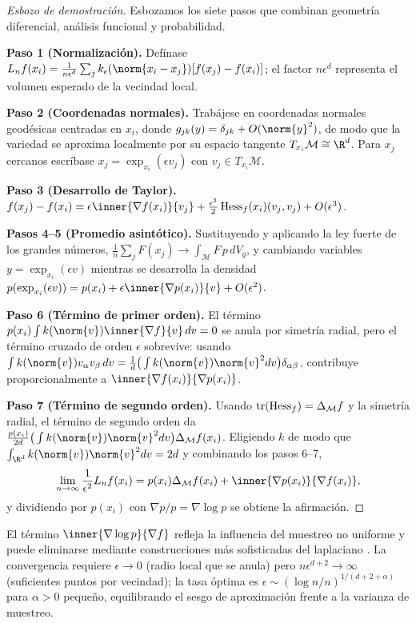 \begin{proof}[Esbozo de demostraci\'on]
Esbozamos los siete pasos que combinan geometr\'ia diferencial, an\'alisis
funcional y probabilidad.

\textbf{Paso 1 (Normalizaci\'on).} Def\'inase
$L_n f(x_i) = \frac{1}{n\epsilon^d} \sum_{j} k_\epsilon(\norm{x_i - x_j})
[f(x_j) - f(x_i)]$; el factor $n\epsilon^d$ representa el volumen esperado de la
vecindad local.

\textbf{Paso 2 (Coordenadas normales).} Trab\'ajese en coordenadas normales
geod\'esicas centradas en $x_i$, donde $g_{jk}(y) = \delta_{jk} + O(\norm{y}^2)$,
de modo que la variedad se aproxima localmente por su espacio tangente
$T_{x_i}\mathcal{M} \cong \R^d$. Para $x_j$ cercanos escr\'ibase
$x_j = \exp_{x_i}(\epsilon v_j)$ con $v_j \in T_{x_i}\mathcal{M}$.

\textbf{Paso 3 (Desarrollo de Taylor).}
$f(x_j) - f(x_i) = \epsilon \inner{\nabla f(x_i)}{v_j}
+ \tfrac{\epsilon^2}{2} \Hess_f(x_i)(v_j, v_j) + O(\epsilon^3)$.

\textbf{Pasos 4--5 (Promedio asint\'otico).} Sustituyendo y aplicando la ley
fuerte de los grandes n\'umeros, $\frac1n \sum_j F(x_j) \to
\int_{\mathcal{M}} F\, p\, dV_g$, y cambiando variables
$y = \exp_{x_i}(\epsilon v)$ mientras se desarrolla la densidad
$p(\exp_{x_i}(\epsilon v)) = p(x_i) + \epsilon \inner{\nabla p(x_i)}{v} + O(\epsilon^2)$.

\textbf{Paso 6 (T\'ermino de primer orden).} El t\'ermino
$p(x_i) \int k(\norm{v}) \inner{\nabla f}{v}\, dv = 0$ se anula por simetr\'ia
radial, pero el t\'ermino cruzado de orden $\epsilon$ sobrevive: usando
$\int k(\norm{v}) v_\alpha v_\beta\, dv = \frac1d \big(\int k(\norm{v})\norm{v}^2 dv\big)
\delta_{\alpha\beta}$, contribuye proporcionalmente a
$\inner{\nabla f(x_i)}{\nabla p(x_i)}$.

\textbf{Paso 7 (T\'ermino de segundo orden).} Usando
$\operatorname{tr}(\operatorname{Hess}_f) = \Delta_{\mathcal{M}} f$ y la simetr\'ia radial, el t\'ermino de
segundo orden da $\frac{p(x_i)}{2d}\big(\int k(\norm{v})\norm{v}^2 dv\big)
\Delta_{\mathcal{M}} f(x_i)$. Eligiendo $k$ de modo que
$\int_{\R^d} k(\norm{v})\norm{v}^2 dv = 2d$ y combinando los pasos 6--7,
\[
  \lim_{n\to\infty} \frac{1}{\epsilon^2} L_n f(x_i)
    = p(x_i)\Delta_{\mathcal{M}} f(x_i) + \inner{\nabla p(x_i)}{\nabla f(x_i)} ,
\]
y dividiendo por $p(x_i)$ con $\nabla p / p = \nabla \log p$ se obtiene la
afirmaci\'on.
\end{proof}

El t\'ermino $\inner{\nabla \log p}{\nabla f}$ refleja la influencia del muestreo
no uniforme y puede eliminarse mediante construcciones m\'as sofisticadas del
laplaciano \citep{coifman2006diffusion, hein2007graph}. La convergencia requiere
$\epsilon \to 0$ (radio local que se anula) pero $n\epsilon^{d+2} \to \infty$
(suficientes puntos por vecindad); la tasa \'optima es
$\epsilon \sim (\log n / n)^{1/(d+2+\alpha)}$ para $\alpha > 0$ peque\~no,
equilibrando el sesgo de aproximaci\'on frente a la varianza de muestreo.

